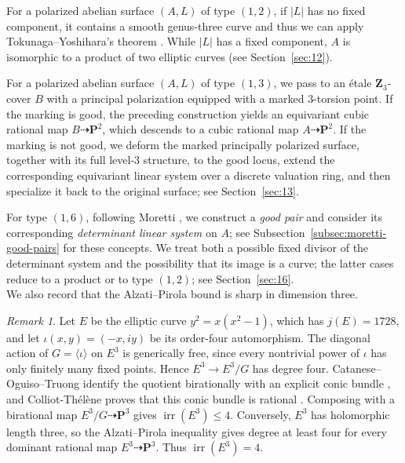\documentclass[12pt]{amsart}
\numberwithin{equation}{section}
\theoremstyle{definition}
\theoremstyle{remark}
\newtheorem{remark}[theorem]{Remark}
\newcommand{\PP}{\mathbf P}
\newcommand{\irr}{\operatorname{irr}}
\begin{document}
For a polarized abelian surface $(A, L)$ of type $(1,2)$,
if $|L|$ has no fixed component, it contains a smooth genus-three curve and thus we can apply Tokunaga--Yoshihara's theorem \cite{TokunagaYoshihara}. While $|L|$ has a
fixed component, $A$ is isomorphic to a product of two elliptic curves  (see Section~\ref{sec:12}).  

For a polarized abelian surface $(A, L)$ of type $(1,3)$, we pass to an \'etale $\mathbf Z_3$-cover $B$ with a principal polarization equipped with a marked $3$-torsion point. If the marking is good, the preceding construction yields an equivariant cubic rational map
$B\dashrightarrow \PP^2$,
which descends to a cubic rational map
$
A\dashrightarrow \PP^2.
$
If the marking is not good, we deform the marked principally polarized surface, together with its full level-$3$ structure, to the good locus, extend the corresponding equivariant linear system over a discrete valuation ring, and then specialize it back to the original surface; see Section~\ref{sec:13}.


For type $(1,6)$, following
Moretti \cite{Moretti}, we construct a \emph{good pair} and consider its corresponding \emph{determinant linear system} on $A$; see Subsection~\ref{subsec:moretti-good-pairs} for these concepts.
We treat both a
possible fixed divisor of the determinant system and the possibility
that its image is a curve; the latter cases reduce to a product or to
type $(1,2)$; see Section~\ref{sec:16}.\\

We also record that the Alzati--Pirola bound is sharp in dimension three.

\begin{remark}\label{rem:j1728-sharp}
Let $E$ be the elliptic curve $y^2=x(x^2-1)$, which has $j(E)=1728$, and let
$\iota(x,y)=(-x,iy)$ be its order-four automorphism.  The diagonal action
of $G=\langle\iota\rangle$ on $E^3$ is generically free, since every
nontrivial power of $\iota$ has only finitely many fixed points.  Hence
$E^3\to E^3/G$ has degree four.  Catanese--Oguiso--Truong identify the
quotient birationally with an explicit conic bundle
\cite[Proposition~2.5 and Corollary~2.6]{COT14}, and Colliot-Th\'el\`ene proves that this
conic bundle is rational \cite[\S3]{CT15}.  Composing with a birational
map $E^3/G\dashrightarrow\PP^3$ gives $\irr(E^3)\leq4$.  Conversely,
$E^3$ has holomorphic length three, so the Alzati--Pirola inequality
\cite[Theorem~(3,4)]{AlzatiPirola} gives degree at least four for every
dominant rational map $E^3\dashrightarrow\PP^3$.  Thus
$\irr(E^3)=4$.
\end{remark}
\end{document}
